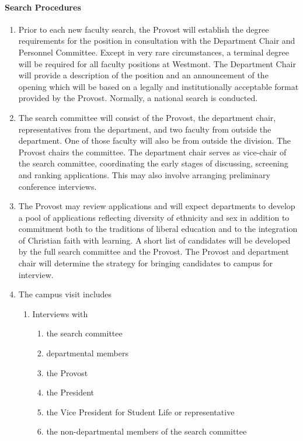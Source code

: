 			\paragraph{Search Procedures}
				\begin{enumerate}[label=\alph*)]
					\item{ Prior to each new faculty search, the Provost will establish the degree requirements for the position in consultation with the Department Chair and Personnel Committee. Except in very rare circumstances, a terminal degree will be required for all faculty positions at Westmont.  The Department Chair will provide a description of the position and an announcement of the opening which will be based on a legally and institutionally acceptable format provided by the Provost.  Normally, a national search is conducted.}
					\item{The search committee will consist of the Provost, the department chair, representatives from the department, and two faculty from outside the department. One of those faculty will also be from outside the division. The Provost chairs the committee. The department chair serves as vice-chair of the search committee, coordinating the early stages of discussing, screening and ranking applications. This may also involve arranging preliminary conference interviews.}
					\item{The Provost may review applications and will expect departments to develop a pool of applications reflecting diversity of ethnicity and sex in addition to commitment both to the traditions of liberal education and to the integration of Christian faith with learning.  A short list of candidates will be developed by the full search committee and the Provost.  The Provost and department chair will determine the strategy for bringing candidates to campus for interview.}
					\item{ The campus visit includes
						\begin{enumerate}[label=(\arabic*)]
							\item{Interviews with
								\begin{enumerate}[label=$\bullet$]
									\item{the search committee}
									\item{departmental members}
									\item{the Provost}
									\item{the President}
									\item{the Vice President for Student Life or representative}
									\item{the non-departmental members of the search committee}

\end{enumerate}}
\end{enumerate}}
\end{enumerate}
